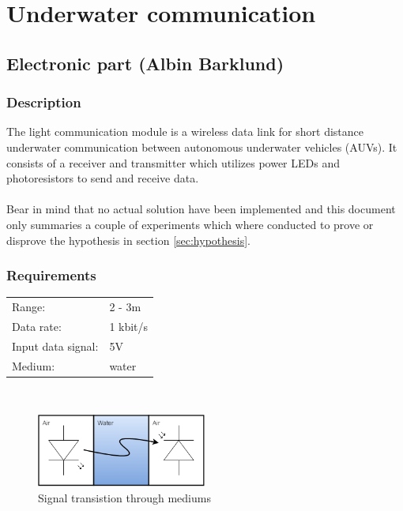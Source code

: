 

\section{Underwater communication}
\label{sec:Underwatercommunication}




\subsection{Electronic part (Albin Barklund)}
\subsubsection{Description}
The light communication module is a wireless data link for short distance underwater communication between autonomous underwater vehicles (AUVs). It consists of a receiver and transmitter which utilizes power LEDs and photoresistors to send and receive data.\\\\
Bear in mind that no actual solution have been implemented and this document only summaries a couple of experiments which where conducted to prove or disprove the hypothesis in section \ref{sec:hypothesis}.
\subsubsection{Requirements}
\label{sec:req}
\begin{tabular}{l l}
Range: & 2 - 3m\\
Data rate: & 1 kbit/s\\
Input data signal: & 5V\\
Medium: & water\\
\end{tabular}\\


\begin{figure}[h]
\centering
\includegraphics[width=0.5\textwidth]{medium}
\caption{Signal transistion through mediums}
\label{fig:con}
\end{figure}


